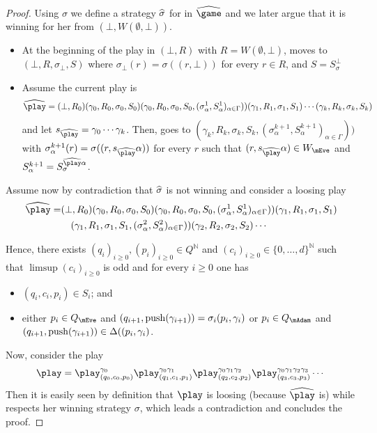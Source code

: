 \begin{proof}
	Using $\sigma$ we define a strategy $\widehat{\sigma}$ for \Eve in $\hgame$ and we later argue that it is winning for her from $(\bot,W(\emptyset,\bot))$. %
	\begin{itemize}
		\item At the beginning of the play in $(\bot,R)$ with $R=W(\emptyset,\bot)$, \Eve moves to $(\bot,R,\sigma_\bot,S)$ where $\sigma_\bot(r) = \sigma((r,\bot))$ for every $r\in R$, and $S=S_\sigma^\bot$
		\item Assume the current play is $$\hplay=(\bot,R_0)(\gamma_0,R_0,\sigma_0,S_0)(\gamma_0,R_0,\sigma_0,S_0,(\sigma^1_\alpha,S^1_\alpha)_{\alpha\in\Gamma}))(\gamma_1,R_1,\sigma_1,S_1)\cdots (\gamma_k,R_k,\sigma_k,S_k)$$ and let $s_{\hplay} = \gamma_0\cdots\gamma_k$. Then, \Eve goes to $(\gamma_k,R_k,\sigma_k,S_k,(\sigma^{k+1}_\alpha,S^{k+1}_\alpha)_{\alpha\in\Gamma}))$ with $\sigma^{k+1}_{\alpha}(r) = \sigma((r,s_{\hplay}\alpha))$ for every $r$ such that $(r,s_{\hplay}\alpha)\in W_\mEve$ and $S^{k+1}_\alpha = S_\sigma^{\hplay\alpha}$. 
	\end{itemize}
	Assume now by contradiction that $\widehat{\sigma}$ is not winning and consider a loosing play \begin{equation*}
\begin{split}
\hplay = & (\bot,R_0)(\gamma_0,R_0,\sigma_0,S_0)(\gamma_0,R_0,\sigma_0,S_0,(\sigma^1_\alpha,S^1_\alpha)_{\alpha\in\Gamma}))(\gamma_1,R_1,\sigma_1,S_1)\\ &\quad (\gamma_1,R_1,\sigma_1,S_1,(\sigma^2_\alpha,S^2_\alpha)_{\alpha\in\Gamma}))(\gamma_2,R_2,\sigma_2,S_2)\cdots	
\end{split}
\end{equation*}
	
Hence, there exists $(q_i)_{i\geq 0},(p_i)_{i\geq 0}\in Q^{\mathbb{N}}$ and $(c_i)_{i\geq 0}\in \{0,\dots,d\}^{\mathbb{N}}$ such that $\limsup(c_i)_{i\geq 0}$ is odd and for every $i\geq 0$ one has
\begin{itemize}
	\item $(q_i,c_i,p_i)\in S_i$; and 
	\item either $p_i\in Q_\mEve$ and $(q_{i+1},\mathrm{push}(\gamma_{i+1}))=\sigma_i(p_i,\gamma_i)$ or $p_i\in Q_\mAdam$ and $(q_{i+1},\mathrm{push}(\gamma_{i+1}))\in \Delta((p_i,\gamma_i)$.
\end{itemize}
Now, consider the play $$\play=\play^{\gamma_0}_{(q_0,c_0,p_0)}\play^{\gamma_0\gamma_1}_{(q_1,c_1,p_1)}\play^{\gamma_0\gamma_1\gamma_2}_{(q_2,c_2,p_2)}\play^{\gamma_0\gamma_1\gamma_2\gamma_3}_{(q_3,c_3,p_3)}\cdots$$
Then it is easily seen by definition that $\play$ is loosing (because $\hplay$ is) while \Eve respects her winning strategy $\sigma$, which leads a contradiction and concludes the proof.
\end{proof}

